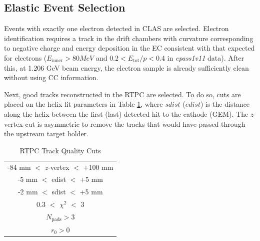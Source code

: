 \documentclass[amsmath,amssymb,notitlepage,12pt]{revtex4-1}
\begin{document}
\subsection{Elastic Event Selection}
Events with exactly one electron detected in CLAS are selected.  Electron identification requires a track in the drift chambers with curvature corresponding to negative charge and energy deposition in the EC consistent with that expected for electrons ($E_{\textrm{inner}}>80MeV$ and $0.2<E_{\textrm{tot}}/p<0.4$ in {\it epass1v11} data).  After this, at 1.206 GeV beam energy, the electron sample is already sufficiently clean without using CC information.

Next, good tracks reconstructed in the RTPC are selected.  To do so, cuts are placed on the helix fit parameters in Table \ref{tab:rtpccuts1}, where $sdist$ ($edist$) is the distance along the helix between the first (last) detected hit to the cathode (GEM).  The $z$-vertex cut is asymmetric to remove the tracks that would have passed through the upstream target holder.
\begin{table}[thpb]
    \caption{\label{tab:rtpccuts1}RTPC Track Quality Cuts}
    \begin{tabular}{c}
    \toprule[1.5pt]
    -84 mm $<$ $z$-vertex $<$ +100 mm \\
    -5 mm $<$ edist $<$ +5 mm \\
    -2 mm  $<$ sdist $<$ +5 mm \\
    0.3   $<$ $\chi^2$ $<$  3 \\
    $N_{\textrm{pads}} > 3 $\\
    $r_0>0$ \\
    \bottomrule[1.5pt]
\end{tabular}
\end{table}
\end{document}
